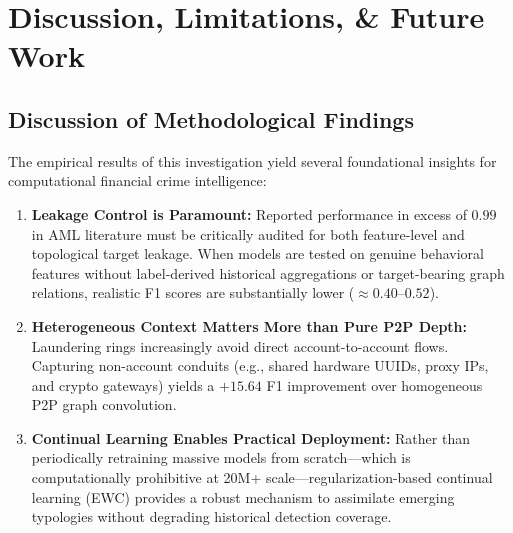 \section{Discussion, Limitations, \&  Future Work}
\label{sec:discussion}

\subsection{Discussion of Methodological Findings}
The empirical results of this investigation yield several foundational insights for computational financial crime intelligence:
\begin{enumerate}
    \item \textbf{Leakage Control is Paramount:} Reported performance in excess of $0.99$ in AML literature must be critically audited for both feature-level and topological target leakage. When models are tested on genuine behavioral features without label-derived historical aggregations or target-bearing graph relations, realistic F1 scores are substantially lower ($\approx 0.40$--$0.52$).
    \item \textbf{Heterogeneous Context Matters More than Pure P2P Depth:} Laundering rings increasingly avoid direct account-to-account flows. Capturing non-account conduits (e.g., shared hardware UUIDs, proxy IPs, and crypto gateways) yields a $+15.64$ F1 improvement over homogeneous P2P graph convolution.
    \item \textbf{Continual Learning Enables Practical Deployment:} Rather than periodically retraining massive models from scratch—which is computationally prohibitive at 20M+ scale—regularization-based continual learning (EWC) provides a robust mechanism to assimilate emerging typologies without degrading historical detection coverage.
\end{enumerate}

